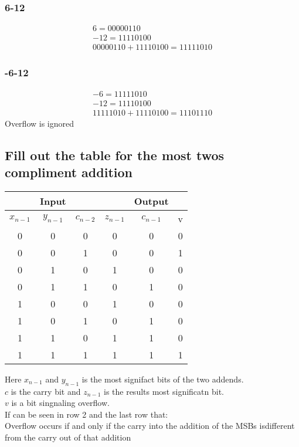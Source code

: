 \documentclass[12pt, a4paper]{article}
\begin{document}
			\subsubsection{6-12}
				\begin{align*}
					6=00000110\\
					-12=11110100\\
					00000110+11110100=11111010
				\end{align*}
			\subsubsection{-6-12}
				\begin{align*}
					-6=11111010\\
					-12=11110100\\
					11111010+11110100=11101110
				\end{align*}
				Overflow is ignored
		\subsection{Fill out the table for the most twos compliment addition}
				\begin{table}[h!]
				\begin{tabular}{ccc|ccc}
				\hline
				          & Input     &           &           & Output    &   \\ \hline
				$x_{n-1}$ & $y_{n-1}$ & $c_{n-2}$ & $z_{n-1}$ & $c_{n-1}$ & v \\ \hline
				0         & 0         & 0         & 0         & 0         & 0 \\
				0         & 0         & 1         & 0         & 0         & 1 \\
				0         & 1         & 0         & 1         & 0         & 0 \\
				0         & 1         & 1         & 0         & 1         & 0 \\
				1         & 0         & 0         & 1         & 0         & 0 \\
				1         & 0         & 1         & 0         & 1         & 0 \\
				1         & 1         & 0         & 1         & 1         & 0 \\
				1         & 1         & 1         & 1         & 1         & 1 \\ \hline
				\end{tabular}
				\end{table}
				Here $x_{n-1}$ and $y_{n-1}$ is the most signifact bits of the two addends.\\
				$c$ is the carry bit and $z_{n-1}$ is the results most significatn bit. \\
				$v$ is a bit singnaling overflow.\\
				If can be seen in row 2 and the last row that:\\
				Overflow occurs if and only if the carry into the addition of the MSBs isdifferent from the carry out of that addition
\end{document}
